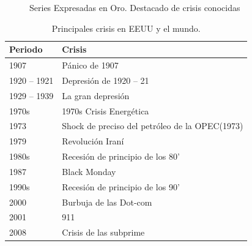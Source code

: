 \documentclass[a4paper]{article}
\begin{document}
\begin{figure}[H]
	\centering
	\caption{Series Expresadas en Oro. Destacado de crisis conocidas} \label{fig:series_crisis}
\end{figure}

\begin{table}[ht]
	\centering
	\begin{tabular}{ll}
		\hline
		Periodo & Crisis \\ 
		\hline
		1907 & Pánico de 1907 \\ 
		1920 – 1921 & Depresión de 1920 – 21 \\ 
		1929 – 1939 & La gran depresión \\ 
		1970s & 1970s Crisis Energética \\ 
		1973 & Shock de preciso del petróleo de la OPEC(1973) \\ 
		1979 & Revolución Iraní\\ 
		1980s & Recesión de principio de los 80'\\ 
		1987 & Black Monday \\ 
		1990s & Recesión de principio de los 90'\\ 
		2000 & Burbuja de las Dot-com \\ 
		2001 & 911 \\ 
		2008 & Crisis de las subprime \\ 
		\hline
	\end{tabular}
\caption{Principales crisis en EEUU y el mundo.}
\label{tabla_crisis}
\end{table}
\end{document}
